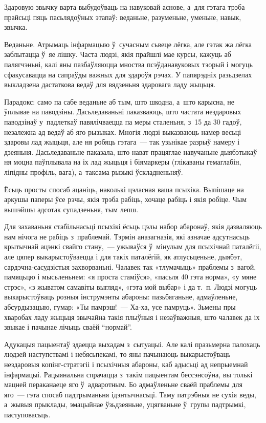 Здаровую звычку варта выбудоўваць на навуковай аснове, а~для гэтага трэба прайсьці пяць пасьлядоўных этапаў: веданьне, разуменьне, уменьне, навык, звычка.

Веданьне. Атрымаць інфармацыю ў~сучасным сьвеце лёгка, але гэтак жа лёгка заблытацца ў~яе лішку. Часта людзі, якія прайшлі мае курсы, кажуць аб палягчэньні, калі яны пазбаўляюцца мноства псэўданавуковых тэорый і могуць сфакусавацца на сапраўды важных для здароўя рэчах. У папярэдніх разьдзелах выкладзена дастаткова ведаў для вядзеньня здаровага ладу жыцьця.

Парадокс: само па сабе веданьне аб тым, што шкодна, а~што карысна, не ўплывае на паводзіны. Дасьледаваньні паказваюць, што частата нездаровых паводзінаў у~падлеткаў павялічваецца па меры сталеньня, з~15 да 30 гадоў, незалежна ад ведаў аб яго рызыках. Многія людзі выказваюць намер весьці здаровы лад жыцьця, але ня робяць гэтага~--- так узьнікае разрыў намеру і дзеяньня. Дасьледаваньне паказала, што нават працяглае навучаньне дыябэтыкаў ня моцна паўплывала на іх лад жыцьця і біямаркеры (глікаваны гемаглабін, ліпідны профіль, вага), а~таксама рызыкі ўскладненьняў.

Ёсьць просты спосаб ацаніць, наколькі цэласная ваша псыхіка. Выпішаце на аркушы паперы ўсе рэчы, якія трэба рабіць, хочаце рабіць і якія робіце. Чым вышэйшы адсотак супадзеньня, тым лепш.

Для захаваньня стабільнасьці псыхікі ёсьць цэлы набор абаронаў, якія дазваляюць нам нічога не рабіць з~праблемай. Тэрмін аназагназія, які азначае адсутнасьць крытычнай ацэнкі свайго стану,~--- ужываўся ў~мінулым для псыхічнай паталёгіі, але цяпер выкарыстоўваецца і для такіх паталёгій, як атлусьценьне, дыябэт, сардэчна-сасудзістыя захворваньні. Чалавек так «тлумачыць» праблемы з~вагой, памяцьцю і мысьленьнем: «я проста стаміўся», «пасьля 40 гэта норма», «у мяне стрэс», «з жыватом самавіты выгляд», «гэта мой выбар» і да т.~п. Людзі могуць выкарыстоўваць розныя інструмэнты абароны: пазьбяганьне, адмаўленьне, абсурдызацыю, гумар: «Ты памрэш!~--- Ха-ха, усе памруць». Зьмены пры хваробах ладу жыцьця звычайна такія плыўныя і незаўважныя, што чалавек да іх звыкае і пачынае лічыць сваёй ``нормай''. 

Адукацыя пацыентаў здаецца выхадам з~сытуацыі. Але калі празьмерна палохаць людзей наступствамі і небясьпекамі, то яны пачынаюць выкарыстоўваць нездаровыя копінг-стратэгіі і псыхічныя абароны, каб адысьці ад непрыемнай інфармацыі. Рацыянальна спрачацца з~такім пацыентам бессэнсоўна, вы толькі мацней пераканаеце яго ў~адваротным. Бо адмаўленьне сваёй праблемы для яго~--- гэта спосаб падтрыманьня ідэнтычнасьці. Таму патрэбныя не сухія веды, а~жывыя прыклады, эмацыйнае ўзьдзеяньне, уцягваньне ў~групы падтрымкі, паступовасьць.

